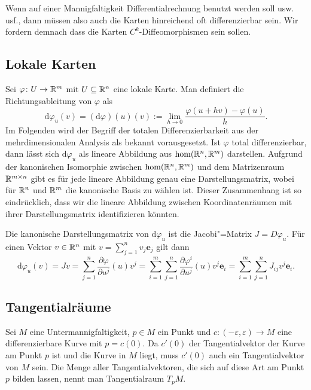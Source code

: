Wenn auf einer Mannigfaltigkeit Differentialrechnung benutzt
werden soll usw. usf., dann müssen also auch die Karten hinreichend oft
differenzierbar sein. Wir fordern demnach dass die Karten
$C^k$-Diffeomorphismen sein sollen.


\subsection{Lokale Karten}

Sei $\varphi\colon U\to\mathbb R^m$ mit $U\subseteq\mathbb R^n$ eine lokale Karte.
Man definiert die Richtungsableitung von $\varphi$ als
\begin{equation}
\mathrm d\varphi_u(v) = (\mathrm d\varphi)(u)(v)
:= \lim_{h\to 0}\frac{\varphi(u+hv)-\varphi(u)}{h}.
\end{equation}
Im Folgenden wird der Begriff der totalen Differenzierbarkeit
aus der mehrdimensionalen Analysis als bekannt vorausgesetzt.
Ist $\varphi$ total differenzierbar, dann lässt sich
$\mathrm d\varphi_u$ als lineare Abbildung aus $\hom(\mathbb R^n,\mathbb R^m)$
darstellen. Aufgrund der kanonischen Isomorphie zwischen
$\hom(\mathbb R^n,\mathbb R^m)$ und dem Matrizenraum $\mathbb R^{m\times n}$ gibt
es für jede lineare Abbildung genau eine Darstellungsmatrix,
wobei für $\mathbb R^n$ und $\mathbb R^m$ die kanonische Basis zu wählen ist.
Dieser Zusammenhang ist so eindrücklich, dass wir die lineare
Abbildung zwischen Koordinatenräumen mit ihrer Darstellungsmatrix
identifizieren könnten.

Die kanonische Darstellungsmatrix von $\mathrm d\varphi_u$ ist die
Jacobi"=Matrix $J=D\varphi_u$. Für einen Vektor $v\in\mathbb R^n$ mit
$v=\sum_{j=1}^n v_j \mathbf e_j$ gilt dann
\begin{equation}
\mathrm d\varphi_u(v) = Jv
= \sum_{j=1}^n \frac{\partial\varphi}{\partial u^j}(u) v^j
= \sum_{i=1}^m\sum_{j=1}^n \frac{\partial\varphi^i}{\partial u^j}(u) v^j\mathbf e_i
= \sum_{i=1}^m\sum_{j=1}^n J_{ij} v^j\mathbf e_i.
\end{equation}

\subsection{Tangentialräume}

Sei $M$ eine Untermannigfaltigkeit, $p\in M$ ein Punkt und
$c\colon (-\varepsilon,\varepsilon)\to M$ eine differenzierbare Kurve
mit $p=c(0)$. Da $c'(0)$ der Tangentialvektor der Kurve am Punkt $p$
ist und die Kurve in $M$ liegt, muss $c'(0)$ auch ein Tangentialvektor
von $M$ sein. Die Menge aller Tangentialvektoren, die sich auf
diese Art am Punkt $p$ bilden lassen, nennt man
Tangentialraum $T_p M$.

